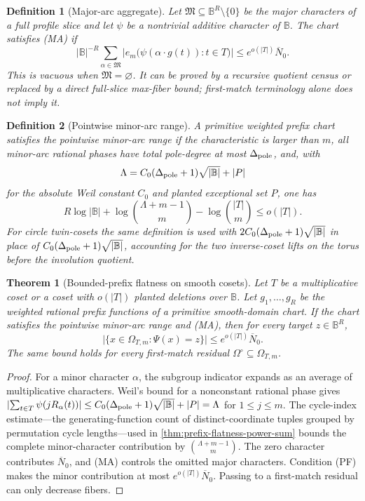 \documentclass[12pt,a4paper]{amsart}
\numberwithin{equation}{section}
\newtheorem{theorem}{Theorem}[section]
\newtheorem{definition}[definition]{Definition}
\theoremstyle{remark}
\newcommand{\B}{\mathbb B}
\newcommand{\Omc}{\Omega^{\circ}}
\newcommand{\barN}{\overline N}
\newcommand{\abs}[1]{\lvert #1\rvert}
\begin{document}
\begin{definition}[Major-arc aggregate]\label{def:major-arc-aggregate}
Let \(\mathfrak M\subseteq\B^R\setminus\{0\}\) be the major characters of
a full profile slice and let \(\psi\) be a nontrivial additive character of
\(\B\).  The chart satisfies \textup{(MA)} if
\[
 \tag{MA}\label{eq:major-arc-aggregate}
 \abs\B^{-R}\sum_{\alpha\in\mathfrak M}
 \left|e_m\bigl(\psi(\alpha\cdot g(t)):t\in T\bigr)\right|
 \le e^{o(\abs T)}\barN_0.
\]
This is vacuous when \(\mathfrak M=\varnothing\).  It can be proved by a
recursive quotient census or replaced by a direct full-slice max-fiber
bound; first-match terminology alone does not imply it.
\end{definition}

\begin{definition}[Pointwise minor-arc range]\label{def:prefix-flat-range}
A primitive weighted prefix chart satisfies the pointwise minor-arc range if the characteristic is larger than \(m\), all minor-arc rational phases have total pole-degree at most \(\Delta_{\rm pole}\), and, with
\[
        \Lambda=C_0(\Delta_{\rm pole}+1)\sqrt{\abs\B}+\abs P
\]
for the absolute Weil constant \(C_0\) and planted exceptional set \(P\), one has
\[
        \tag{PF}
        R\log\abs\B+
        \log\binom{\Lambda+m-1}{m}
        -\log\binom{\abs T}{m}\le o(\abs T).
\]
For circle twin-cosets the same definition is used with \(2C_0(\Delta_{\rm pole}+1)\sqrt{\abs\B}\) in place of \(C_0(\Delta_{\rm pole}+1)\sqrt{\abs\B}\), accounting for the two inverse-coset lifts on the torus before the involution quotient.
\end{definition}

\begin{theorem}[Bounded-prefix flatness on smooth cosets]\label{thm:bounded-prefix-equidistribution}
Let \(T\) be a multiplicative coset or a coset with \(o(\abs T)\) planted
deletions over \(\B\).  Let \(g_1,\ldots,g_R\) be the weighted rational
prefix functions of a primitive smooth-domain chart.  If the chart
satisfies the pointwise minor-arc range and \textup{(MA)}, then for every
target \(z\in\B^R\),
\[
        \abs{\{x\in\Omega_{T,m}:\Psi(x)=z\}}
        \le e^{o(\abs T)}\barN_0.
\]
The same bound holds for every first-match residual
\(\Omc\subseteq\Omega_{T,m}\).
\end{theorem}

\begin{proof}
For a minor character \(\alpha\), the subgroup indicator expands as an
average of multiplicative characters.  Weil's bound for a nonconstant
rational phase gives
\(\abs{\sum_{t\in T}\psi(jR_\alpha(t))}\le
C_0(\Delta_{\rm pole}+1)\sqrt{\abs\B}+\abs P=\Lambda\) for \(1\le j\le m\).  The
cycle-index estimate---the generating-function count of distinct-coordinate
tuples grouped by permutation cycle lengths---used in
\cref{thm:prefix-flatness-power-sum} bounds
the complete minor-character contribution by
\(\binom{\Lambda+m-1}{m}\).  The zero character contributes \(\barN_0\),
and \textup{(MA)} controls the omitted major characters.  Condition
\textup{(PF)} makes the minor contribution at most
\(e^{o(\abs T)}\barN_0\).  Passing to a first-match residual can only decrease
fibers.
\end{proof}
\end{document}
